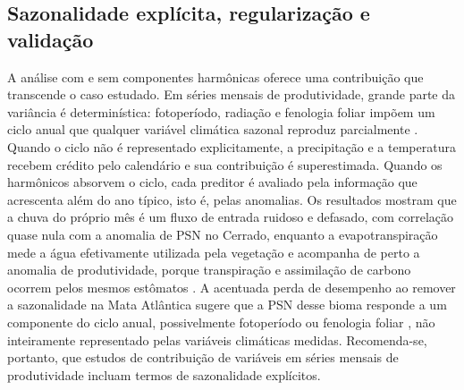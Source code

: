 \documentclass[a4paper,fleqn]{cas-sc}
\begin{document}
\subsection{Sazonalidade explícita, regularização e validação}

A análise com e sem componentes harmônicas oferece uma contribuição que transcende o caso estudado. Em séries mensais de produtividade, grande parte da variância é determinística: fotoperíodo, radiação e fenologia foliar impõem um ciclo anual que qualquer variável climática sazonal reproduz parcialmente \citep{wu2016,alberton2019}. Quando o ciclo não é representado explicitamente, a precipitação e a temperatura recebem crédito pelo calendário e sua contribuição é superestimada. Quando os harmônicos absorvem o ciclo, cada preditor é avaliado pela informação que acrescenta além do ano típico, isto é, pelas anomalias. Os resultados mostram que a chuva do próprio mês é um fluxo de entrada ruidoso e defasado, com correlação quase nula com a anomalia de PSN no Cerrado, enquanto a evapotranspiração mede a água efetivamente utilizada pela vegetação e acompanha de perto a anomalia de produtividade, porque transpiração e assimilação de carbono ocorrem pelos mesmos estômatos \citep{lawson2019}. A acentuada perda de desempenho ao remover a sazonalidade na Mata Atlântica sugere que a PSN desse bioma responde a um componente do ciclo anual, possivelmente fotoperíodo ou fenologia foliar \citep{borchert2001,wu2016}, não inteiramente representado pelas variáveis climáticas medidas. Recomenda-se, portanto, que estudos de contribuição de variáveis em séries mensais de produtividade incluam termos de sazonalidade explícitos.
\end{document}
